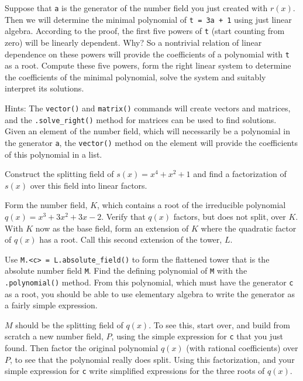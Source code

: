 %
Suppose that \verb?a? is the generator of the number field you just created with $r(x)$.  Then we will determine the minimal polynomial of \verb?t = 3a + 1? using just linear algebra.  According to the proof, the first five powers of \verb?t? (start counting from zero) will be linearly dependent.  Why?  So a nontrivial relation of linear dependence on these powers will provide the coefficients of a polynomial with \verb?t? as a root.  Compute these five powers, form the right linear system to determine the coefficients of the minimal polynomial, solve the system and suitably interpret its solutions.\par
%
Hints:  The \verb?vector()? and \verb?matrix()? commands will create vectors and matrices, and the \verb?.solve_right()? method for matrices can be used to find solutions. Given an element of the number field, which will necessarily be a polynomial in the generator \verb?a?, the \texttt{vector()} method on the element will provide the coefficients of this polynomial in a list.
\begin{sageverbatim}\end{sageverbatim}
%
%
Construct the splitting field of $s(x)=x^4+x^2+1$ and find a factorization of $s(x)$  over this field into linear factors.
\begin{sageverbatim}\end{sageverbatim}
%
%
Form the number field, $K$, which contains a root of the irreducible polynomial $q(x)=x^3+3x^2+3x-2$.  Verify that $q(x)$ factors, but does not split, over $K$.  With $K$ now as the base field, form an extension of $K$ where the quadratic factor of $q(x)$ has a root.  Call this second extension of the tower, $L$.\par
%
Use \verb?M.<c> = L.absolute_field()? to form the flattened tower that is the absolute number field \verb?M?.  Find the defining polynomial of \verb?M? with the \verb?.polynomial()? method.  From this polynomial, which must have the generator \verb?c? as a root, you should be able to use elementary algebra to write the generator as a fairly simple expression.\par
%
$M$ should be the splitting field of $q(x)$.  To see this, start over, and build from scratch a new number field, $P$, using the simple expression for \verb?c? that you just found.  Then factor the original polynomial $q(x)$ (with rational coefficients) over $P$, to see that the polynomial really does split.  Using this factorization, and your simple expression for \verb?c? write simplified expressions for the three roots of $q(x)$.
\begin{sageverbatim}\end{sageverbatim}
%